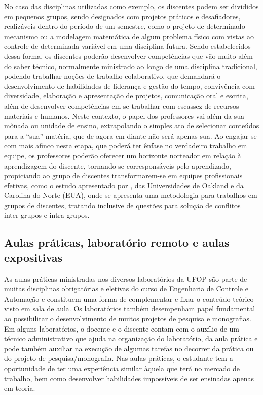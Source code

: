 \documentclass[
	12pt,				%
	openright,			%
	oneside,			%
	a4paper,			%
	english,			%
	brazil				%
	]{abntex2}
\begin{document}
No caso das disciplinas utilizadas como exemplo, os discentes podem ser divididos em pequenos grupos, sendo designados com projetos práticos e desafiadores, realizáveis dentro do período de um semestre, como o projeto de determinado mecanismo ou a modelagem matemática de algum problema físico com vistas ao controle de determinada variável em uma
disciplina futura. Sendo estabelecidos dessa forma, os discentes poderão desenvolver competências que vão muito além do saber técnico, normalmente ministrado ao longo de uma disciplina tradicional, podendo trabalhar noções de trabalho colaborativo, que demandará o desenvolvimento de habilidades de liderança e gestão do tempo, convivência com  diversidade, elaboração e apresentação de projetos, comunicação oral e escrita, além de desenvolver competências em se trabalhar com escassez de recursos materiais e humanos. Neste contexto, o papel dos professores vai além da sua mônada ou unidade de ensino, extrapolando o simples ato de selecionar conteúdos para a ``sua'' matéria, que de agora em diante não será apenas sua. Ao engajar-se com mais afinco nesta etapa, que poderá ter ênfase no verdadeiro trabalho em equipe, os professores poderão oferecer um horizonte norteador em relação à aprendizagem do discente, tornando-se corresponsáveis pelo aprendizado, propiciando ao grupo de discentes transformarem-se em equipes profissionais efetivas, como o estudo apresentado por \citeauthor{oakley}, das Universidades de Oakland e da Carolina do Norte (EUA), onde se apresenta uma metodologia para trabalhos em grupos de discentes, tratando inclusive de questões para solução de conflitos inter-grupos e intra-grupos.


\subsection*{Aulas práticas, laboratório remoto e aulas expositivas}
%
As aulas práticas ministradas nos diversos laboratórios da UFOP são parte de muitas disciplinas obrigatórias e eletivas do curso de Engenharia de Controle e Automação e constituem uma forma de complementar e fixar o conteúdo teórico visto em sala de aula. Os laboratórios também desempenham papel fundamental ao possibilitar o desenvolvimento de muitos projetos de pesquisa e monografias. Em alguns laboratórios, o docente e o discente contam com o auxílio de um técnico administrativo que ajuda na organização do laboratório, da aula prática e pode também auxiliar na execução de algumas tarefas no decorrer da prática ou do projeto de pesquisa/monografia. Nas aulas práticas, o estudante tem a oportunidade de ter uma experiência similar àquela que terá no mercado de trabalho, bem como desenvolver habilidades impossíveis de ser ensinadas apenas em teoria.
\end{document}
